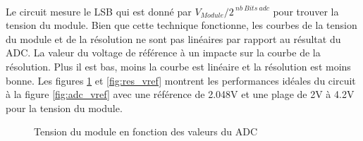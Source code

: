 	\paragraph*{}
	Le circuit mesure le LSB qui est donné par $V_{Module} / 2^{~nb~Bits~adc}$ pour  trouver la tension du module. Bien que cette technique fonctionne, les courbes de la tension du module et de la résolution ne sont pas linéaires par rapport au résultat du ADC. La valeur du voltage de référence à un impacte sur la courbe de la résolution. Plus il est bas, moins la courbe est linéaire et la résolution est moins bonne. Les figures \ref{fig:vmodule_vref} et \ref{fig:res_vref} montrent les performances idéales du circuit à la figure \ref{fig:adc_vref} avec une référence de 2.048V et une plage de 2V à 4.2V pour la tension du module.
	
	\begin{figure}[H]
		\begin{minipage}{0.45\textwidth}
			\centering
			\caption{Tension du module en fonction des valeurs du ADC}
			\label{fig:vmodule_vref}
		\end{minipage}
		\hfill
		\begin{minipage}{0.45\textwidth}
			\centering

\end{minipage}
\end{figure}
